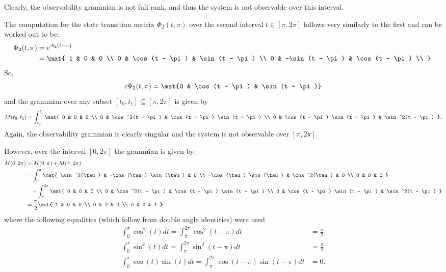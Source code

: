 \documentclass{homework}
\begin{document}
Clearly, the observability grammian is not full rank, and
thus the system is not observable over this interval. 

The computation for the state transition matrix $\Phi_2(t, \pi)$ over the second
interval $t \in [\pi, 2\pi]$ follows very similarly to the first and can be
worked out to be:
\begin{align*}
    \Phi_2(t, \pi) &= e^{A_2(t - \pi)} \\
        &= \mat{
            1 & 0 & 0 \\
            0 & \cos(t - \pi) & \sin(t - \pi) \\
            0 & -\sin(t - \pi) & \cos(t - \pi) \\
        }.
\end{align*}
So,
\begin{equation*}
    c \Phi_2(t, \pi) = \mat{0 & \cos(t - \pi) & \sin(t - \pi)}
\end{equation*}
and the grammian over any subset $[t_0, t_1] \subseteq [\pi, 2\pi]$
is given by
\begin{equation*}
    M(t_0, t_1) = \int_{t_0}^{t_1} \mat{
        0 & 0 & 0 \\
        0 & \cos^2(t - \pi) & \cos(t - \pi) \sin(t - \pi) \\
        0 & \cos(t - \pi) \sin(t - \pi) & \sin^2(t - \pi)
    }.
\end{equation*}
Again, the observability grammian is clearly singular and the system
is not observable over $[\pi, 2\pi]$.

However, over the interval $[0, 2\pi]$ the grammian is given by:
\begin{align*}
    M(0, 2\pi) &= M(0, \pi) + M(\pi, 2\pi)  \\
        &= \int_{0}^{\pi} \mat{
            \sin^2(\tau) & -\cos(\tau) \sin(\tau) & 0 \\
            -\cos(\tau) \sin(\tau) & \cos^2(\tau) & 0 \\
            0 & 0 & 0
        } \\
        &\quad + \int_{\pi}^{2\pi} \mat{
            0 & 0 & 0 \\
            0 & \cos^2(t - \pi) & \cos(t - \pi) \sin(t - \pi) \\
            0 & \cos(t - \pi) \sin(t - \pi) & \sin^2(t - \pi)
        } \\
        &= \frac{\pi}{2} \mat{
            1 & 0 & 0 \\
            0 & 2 & 0 \\ 
            0 & 0 & 1
        }
\end{align*}
where the following equalities (which follow from double angle identities)
were used
\begin{align*}
    \int_{0}^{\pi} \cos^2(t) dt = 
    \int_{\pi}^{2\pi} \cos^2(t - \pi) dt &=  \frac{\pi}{2} \\
    \int_{0}^{\pi} \sin^2(t) dt = 
    \int_{\pi}^{2\pi} \sin^2(t - \pi) dt &= \frac{\pi}{2} \\
    \int_{0}^{\pi} \cos(t) \sin(t) dt = 
    \int_{\pi}^{2\pi} \cos(t - \pi) \sin(t - \pi) dt &= 0.
\end{align*}
\end{document}
